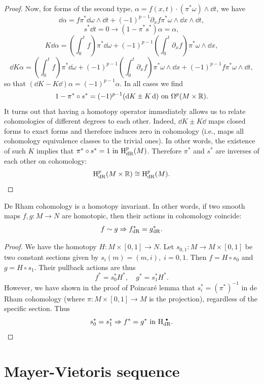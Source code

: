 \begin{proof}
    Now, for forms of the second type, $\alpha=f(x,t)\cdot(\pi^\ast\omega)\wedge\dd t$, we have
    \[\dd\alpha=f\pi^\ast\dd\omega\wedge\dd t+(-1)^{p-1}\partial_x f\pi^\ast\omega\wedge\dd x\wedge\dd t,\]
    \[s^\ast\dd t=0\rightarrow (1-\pi^\ast s^\ast)\alpha=\alpha,\]
    \[K\dd \alpha=\left(\int_0^t f\right)\pi^\ast\dd\omega+(-1)^{p-1}\left(\int_0^t\partial_x f\right)\pi^\ast\omega\wedge\dd x,\]
    \[\dd K\alpha=\left(\int_0^t f\right)\pi^\ast\dd\omega+(-1)^{p-1}\left(\int_0^t\partial_x f\right)\pi^\ast\omega\wedge\dd x+(-1)^{p-1}f\pi^\ast\omega\wedge\dd t,\]
    so that $(\dd K-K \dd)\alpha=(-1)^{p-1}\alpha$.
    In all cases we find
    \[1-\pi^\ast\circ s^\ast=(-1)^{p-1}(\dd K\pm K \dd) \text{ on }\Omega^p(M\times\bbR).\]
    It turns out that having a homotopy operator immediately allows us to relate cohomologies of different degrees to each other. Indeed, $\dd K\pm K\dd$ maps closed forms to exact forms and therefore induces zero in cohomology (i.e., maps all cohomology equivalence classes to the trivial ones).
    In other words, the existence of such $K$ implies that 
    $\pi^\ast\circ s^\ast=1 \text{ in }\rmH^p_{\rm dR}(M)$.
    Therefore $\pi^\ast$ and $s^\ast$ are inverses of each other on cohomology:
    \[\rmH^p_{\rm dR}(M\times\bbR)\cong \rmH^p_{\rm dR}(M).\]
\end{proof}

\begin{cor}
    De Rham cohomology is a homotopy invariant. In other words, if two smooth maps $f,g:M\to N$ are homotopic, then their actions in cohomology coincide:
    \[f\sim g\implies f^\ast_{\rm dR}=g^\ast_{\rm dR}.\]
\end{cor}
\begin{proof}
    We have the homotopy $H:M\times[0,1]\to N$. Let $s_{0,1}:M\to M\times [0,1]$ be two constant sections given by $s_i(m)=(m,i),\;i=0,1$. Then $f=H\circ s_0$ and $g=H\circ s_1$. Their pullback actions are thus
    \[f^\ast=s_0^\ast H^\ast,\quad g^\ast=s_1^\ast H^\ast.\]
    However, we have shown in the proof of Poincar\'e lemma that $s_i^\ast=(\pi^\ast)^{-1}$ in de Rham cohomology (where $\pi:M\times [0,1]\to M$ is the projection), regardless of the specific section. Thus
    \[s_0^\ast=s_1^\ast\implies f^\ast=g^\ast \text{ in }\rmH^{\smbullet }_{\rm dR}.\]
\end{proof}


\section{Mayer-Vietoris sequence}

